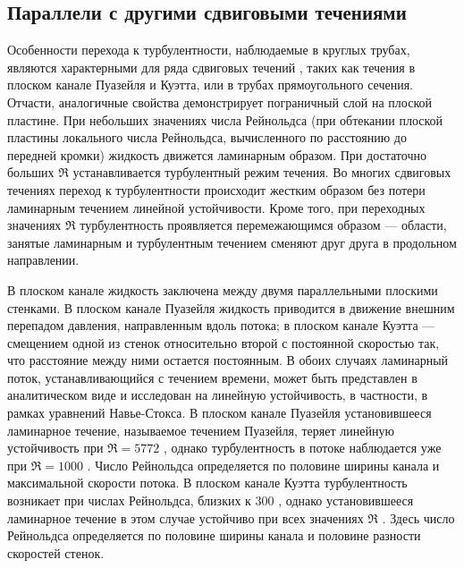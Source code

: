	\subsection{Параллели с другими сдвиговыми течениями}

Особенности перехода к турбулентности, наблюдаемые в круглых трубах, являются характерными для ряда сдвиговых течений \cite{Manneville2015, Manneville2016}, таких как течения в плоском канале Пуазейля и Куэтта, или в трубах прямоугольного сечения. Отчасти, аналогичные свойства демонстрирует пограничный слой на плоской пластине. При небольших значениях числа Рейнольдса (при обтекании плоской пластины локального числа Рейнольдса, вычисленного по расстоянию до передней кромки) жидкость движется ламинарным образом. При достаточно больших $\Re$ устанавливается турбулентный режим течения. Во многих сдвиговых течениях переход к турбулентности происходит жестким образом без потери ламинарным течением линейной устойчивости. Кроме того, при переходных значениях $\Re$ турбулентность проявляется перемежающимся образом --- области, занятые ламинарным и турбулентным течением сменяют друг друга в продольном направлении.  

В плоском канале жидкость заключена между двумя параллельными плоскими стенками. В плоском канале Пуазейля жидкость приводится в движение внешним перепадом давления, направленным вдоль потока; в плоском канале Куэтта --- смещением одной из стенок относительно второй с постоянной скоростью так, что расстояние между ними остается постоянным. В обоих случаях ламинарный поток, устанавливающийся с течением времени, может быть представлен в аналитическом виде и исследован на линейную устойчивость, в частности, в рамках уравнений Навье-Стокса. В плоском канале Пуазейля установившееся ламинарное течение, называемое течением Пуазейля, теряет линейную устойчивость при $\Re = 5772$ \cite{Orszag1971}, однако турбулентность в потоке наблюдается уже при $\Re = 1000$ \cite{Orszag1980}. Число Рейнольдса определяется по половине ширины канала и максимальной скорости потока. В плоском канале Куэтта турбулентность возникает при числах Рейнольдса, близких к $300$ \cite{Bottin1998}, однако установившееся ламинарное течение в этом случае устойчиво при всех значениях $\Re$ \cite{Romanov1973}. Здесь число Рейнольдса определяется по половине ширины канала и половине разности скоростей стенок. 

